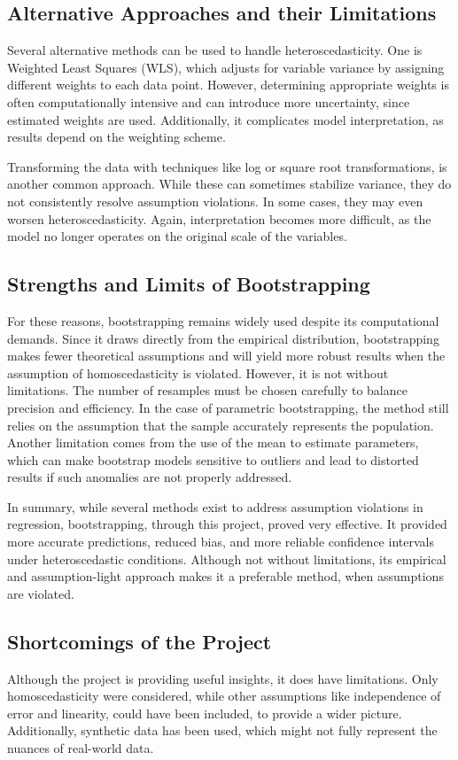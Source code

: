 \subsection{Alternative Approaches and their Limitations}
Several alternative methods can be used to handle heteroscedasticity. One is Weighted Least Squares (WLS), which adjusts for variable variance by assigning different weights to each data point. However, determining appropriate weights is often computationally intensive and can introduce more uncertainty, since estimated weights are used. Additionally, it complicates model interpretation, as results depend on the weighting scheme\cite{wls}.

\noindent Transforming the data with techniques like log or square root transformations, is another common approach. While these can sometimes stabilize variance, they do not consistently resolve assumption violations. In some cases, they may even worsen heteroscedasticity. Again, interpretation becomes more difficult, as the model no longer operates on the original scale of the variables.


\subsection{Strengths and Limits of Bootstrapping}
For these reasons, bootstrapping remains widely used despite its computational demands. Since it draws directly from the empirical distribution, bootstrapping makes fewer theoretical assumptions and will yield more robust results when the assumption of homoscedasticity is violated. However, it is not without limitations. The number of resamples must be chosen carefully to balance precision and efficiency. In the case of parametric bootstrapping, the method still relies on the assumption that the sample accurately represents the population. Another limitation comes from the use of the mean to estimate parameters, which can make bootstrap models sensitive to outliers and lead to distorted results if such anomalies are not properly addressed.

\noindent In summary, while several methods exist to address assumption violations in regression, bootstrapping, through this project, proved very effective. It provided more accurate predictions, reduced bias, and more reliable confidence intervals under heteroscedastic conditions. Although not without limitations, its empirical and assumption-light approach makes it a preferable method, when assumptions are violated.

\subsection{Shortcomings of the Project}
Although the project is providing useful insights, it does have limitations. Only homoscedasticity were considered, while other assumptions like independence of error and linearity, could have been included, to provide a wider picture. Additionally, synthetic data has been used, which might not fully represent the nuances of real-world data.
